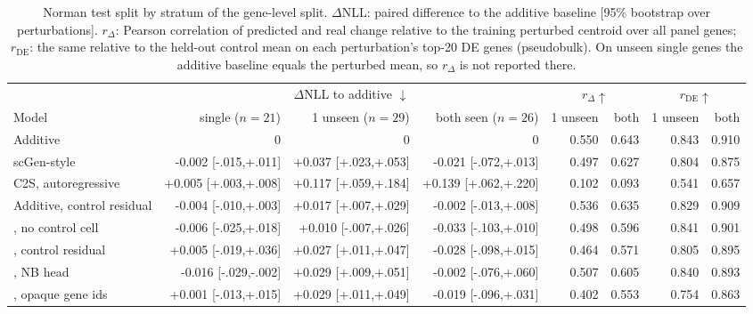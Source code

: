 \begin{table}[t]
\centering
\footnotesize
\setlength{\tabcolsep}{1.8pt}
\begin{tabular}{lrrrrrrr}
\toprule
 & \multicolumn{3}{c}{$\Delta$NLL to additive $\downarrow$} & \multicolumn{2}{c}{$r_\Delta\uparrow$} & \multicolumn{2}{c}{$r_{\mathrm{DE}}\uparrow$} \\
\cmidrule(lr){2-4}\cmidrule(lr){5-6}\cmidrule(lr){7-8}
Model & single ($n=21$) & 1 unseen ($n=29$) & both seen ($n=26$) & 1 unseen & both & 1 unseen & both \\
\midrule
Additive & 0 & 0 & 0 & 0.550 & 0.643 & 0.843 & 0.910 \\
scGen-style & -0.002 [-.015,+.011] & +0.037 [+.023,+.053] & -0.021 [-.072,+.013] & 0.497 & 0.627 & 0.804 & 0.875 \\
C2S, autoregressive & +0.005 [+.003,+.008] & +0.117 [+.059,+.184] & +0.139 [+.062,+.220] & 0.102 & 0.093 & 0.541 & 0.657 \\
Additive, control residual & -0.004 [-.010,+.003] & +0.017 [+.007,+.029] & -0.002 [-.013,+.008] & 0.536 & 0.635 & 0.829 & 0.909 \\
\rowcolor{ours}\cad{}, no control cell & -0.006 [-.025,+.018] & +0.010 [-.007,+.026] & -0.033 [-.103,+.010] & 0.498 & 0.596 & 0.841 & 0.901 \\
\rowcolor{ours}\cad{}, control residual & +0.005 [-.019,+.036] & +0.027 [+.011,+.047] & -0.028 [-.098,+.015] & 0.464 & 0.571 & 0.805 & 0.895 \\
\rowcolor{ours}\cad{}, NB head & -0.016 [-.029,-.002] & +0.029 [+.009,+.051] & -0.002 [-.076,+.060] & 0.507 & 0.605 & 0.840 & 0.893 \\
\rowcolor{ours}\cad{}, opaque gene ids & +0.001 [-.013,+.015] & +0.029 [+.011,+.049] & -0.019 [-.096,+.031] & 0.402 & 0.553 & 0.754 & 0.863 \\
\bottomrule
\end{tabular}
\caption{Norman test split by stratum of the gene-level split. $\Delta$NLL: paired difference to the additive baseline [95\% bootstrap over perturbations]. $r_\Delta$: Pearson correlation of predicted and real change relative to the training perturbed centroid over all panel genes; $r_{\mathrm{DE}}$: the same relative to the held-out control mean on each perturbation's top-20 DE genes (pseudobulk). On unseen single genes the additive baseline equals the perturbed mean, so $r_\Delta$ is not reported there.}
\label{tab:strata}
\end{table}
